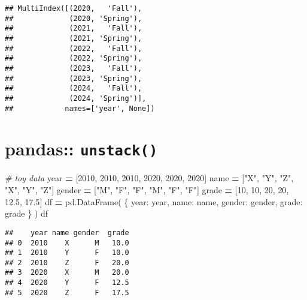 \documentclass[
]{book}
\newenvironment{Shaded}{\begin{snugshade}}{\end{snugshade}}
\newcommand{\CommentTok}[1]{\textcolor[rgb]{0.56,0.35,0.01}{\textit{#1}}}
\newcommand{\DecValTok}[1]{\textcolor[rgb]{0.00,0.00,0.81}{#1}}
\newcommand{\FloatTok}[1]{\textcolor[rgb]{0.00,0.00,0.81}{#1}}
\newcommand{\NormalTok}[1]{#1}
\newcommand{\OperatorTok}[1]{\textcolor[rgb]{0.81,0.36,0.00}{\textbf{#1}}}
\newcommand{\StringTok}[1]{\textcolor[rgb]{0.31,0.60,0.02}{#1}}
\begin{document}
\begin{verbatim}
## MultiIndex([(2020,   'Fall'),
##             (2020, 'Spring'),
##             (2021,   'Fall'),
##             (2021, 'Spring'),
##             (2022,   'Fall'),
##             (2022, 'Spring'),
##             (2023,   'Fall'),
##             (2023, 'Spring'),
##             (2024,   'Fall'),
##             (2024, 'Spring')],
##            names=['year', None])
\end{verbatim}

\hypertarget{pandas-unstack}{%
\section{\texorpdfstring{pandas:: \texttt{unstack()}}{pandas:: unstack()}}\label{pandas-unstack}}

\begin{Shaded}
\begin{Highlighting}[]
\CommentTok{\# toy data}
\NormalTok{year }\OperatorTok{=}\NormalTok{ [}\DecValTok{2010}\NormalTok{, }\DecValTok{2010}\NormalTok{, }\DecValTok{2010}\NormalTok{, }\DecValTok{2020}\NormalTok{, }\DecValTok{2020}\NormalTok{, }\DecValTok{2020}\NormalTok{]}
\NormalTok{name }\OperatorTok{=}\NormalTok{ [}\StringTok{"X"}\NormalTok{, }\StringTok{"Y"}\NormalTok{, }\StringTok{"Z"}\NormalTok{, }\StringTok{"X"}\NormalTok{, }\StringTok{"Y"}\NormalTok{, }\StringTok{"Z"}\NormalTok{]}
\NormalTok{gender }\OperatorTok{=}\NormalTok{ [}\StringTok{"M"}\NormalTok{, }\StringTok{"F"}\NormalTok{, }\StringTok{"F"}\NormalTok{, }\StringTok{"M"}\NormalTok{, }\StringTok{"F"}\NormalTok{, }\StringTok{"F"}\NormalTok{]}
\NormalTok{grade }\OperatorTok{=}\NormalTok{ [}\DecValTok{10}\NormalTok{, }\DecValTok{10}\NormalTok{, }\DecValTok{20}\NormalTok{, }\DecValTok{20}\NormalTok{, }\FloatTok{12.5}\NormalTok{, }\FloatTok{17.5}\NormalTok{]}
\NormalTok{df }\OperatorTok{=}\NormalTok{ pd.DataFrame(}
\NormalTok{    \{}
    \StringTok{\textquotesingle{}year\textquotesingle{}}\NormalTok{: year,}
    \StringTok{\textquotesingle{}name\textquotesingle{}}\NormalTok{: name,}
    \StringTok{\textquotesingle{}gender\textquotesingle{}}\NormalTok{: gender,}
    \StringTok{\textquotesingle{}grade\textquotesingle{}}\NormalTok{: grade}
\NormalTok{    \}}
\NormalTok{)}
\NormalTok{df}
\end{Highlighting}
\end{Shaded}

\begin{verbatim}
##    year name gender  grade
## 0  2010    X      M   10.0
## 1  2010    Y      F   10.0
## 2  2010    Z      F   20.0
## 3  2020    X      M   20.0
## 4  2020    Y      F   12.5
## 5  2020    Z      F   17.5
\end{verbatim}
\end{document}
